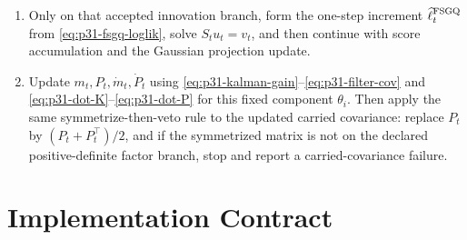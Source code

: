 \documentclass[11pt]{article}
\numberwithin{equation}{section}
\newcommand{\ellhat}{\widehat\ell}
\begin{document}
{\begin{minipage}{0.94\linewidth}
\begin{enumerate}[leftmargin=0.22in]
an innovation-branch failure.
\item Only on that accepted innovation branch, form the one-step increment
\(\ellhat_t^{\rm FSGQ}\) from \eqref{eq:p31-fsgq-loglik}, solve \(S_tu_t=v_t\),
and then continue with score accumulation and the Gaussian projection update.
\item Update \(m_t,P_t,\dot m_t,\dot P_t\) using
\eqref{eq:p31-kalman-gain}--\eqref{eq:p31-filter-cov} and
\eqref{eq:p31-dot-K}--\eqref{eq:p31-dot-P} for this fixed component
\(\theta_i\).  Then apply the same symmetrize-then-veto rule to the updated
carried covariance: replace \(P_t\) by \((P_t+P_t^\top)/2\), and if the
symmetrized matrix is not on the declared positive-definite factor branch, stop
and report a carried-covariance failure.
\end{enumerate}
\end{minipage}}

\section{Implementation Contract}
\label{sec:p31-implementation-contract}
\end{document}
